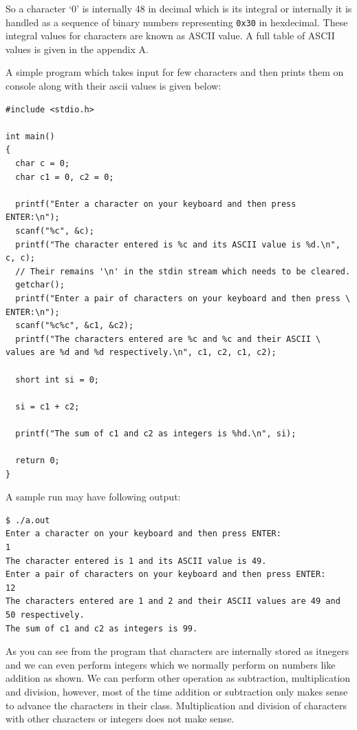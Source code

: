 So a character `0' is internally 48 in decimal which is its integral or
internally it is handled as a sequence of binary numbers representing
\texttt{0x30} in hexdecimal. These integral values for characters are known as
ASCII value. A full table of ASCII values is given in the appendix A.

A simple program which takes input for few characters and then prints them on
console along with their ascii values is given below:

\begin{Verbatim}[frame=single]
#include <stdio.h>

int main()
{
  char c = 0;
  char c1 = 0, c2 = 0;

  printf("Enter a character on your keyboard and then press ENTER:\n");
  scanf("%c", &c);
  printf("The character entered is %c and its ASCII value is %d.\n", c, c);
  // Their remains '\n' in the stdin stream which needs to be cleared.
  getchar();
  printf("Enter a pair of characters on your keyboard and then press \
ENTER:\n");
  scanf("%c%c", &c1, &c2);
  printf("The characters entered are %c and %c and their ASCII \
values are %d and %d respectively.\n", c1, c2, c1, c2);

  short int si = 0;

  si = c1 + c2;

  printf("The sum of c1 and c2 as integers is %hd.\n", si);

  return 0;
}
\end{Verbatim}

A sample run may have following output:

\begin{Verbatim}[frame=single]
$ ./a.out
Enter a character on your keyboard and then press ENTER:
1
The character entered is 1 and its ASCII value is 49.
Enter a pair of characters on your keyboard and then press ENTER:
12
The characters entered are 1 and 2 and their ASCII values are 49 and 50 respectively.
The sum of c1 and c2 as integers is 99.
\end{Verbatim}

As you can see from the program that characters are internally stored as
itnegers and we can even perform integers which we normally perform on
numbers like addition as shown. We can perform other operation as subtraction,
multiplication and division, however, most of the time addition or subtraction
only makes sense to advance the characters in their class. Multiplication and
division of characters with other characters or integers does not make sense.

